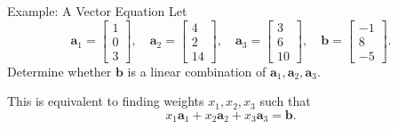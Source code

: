 \begin{frame}{Example: A Vector Equation}
  Let
  \[
    \mathbf{a}_1=\begin{bmatrix}1\\0\\3\end{bmatrix},\quad
    \mathbf{a}_2=\begin{bmatrix}4\\2\\14\end{bmatrix},\quad
    \mathbf{a}_3=\begin{bmatrix}3\\6\\10\end{bmatrix},\quad
    \mathbf{b}=\begin{bmatrix}-1\\8\\-5\end{bmatrix}.
  \]
  Determine whether $\mathbf{b}$ is a linear combination of
  $\mathbf{a}_1,\mathbf{a}_2,\mathbf{a}_3$.

  \medskip
  \pause
  This is equivalent to finding weights $x_1,x_2,x_3$ such that
  \[
    x_1\mathbf{a}_1+x_2\mathbf{a}_2+x_3\mathbf{a}_3=\mathbf{b}.
  \]
\end{frame}

